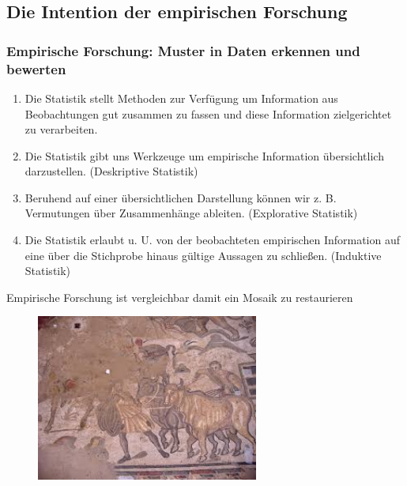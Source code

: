 \documentclass[usenames,dvipsnames,handout]{beamer}
\begin{document}
\subsection{Die Intention der empirischen Forschung}
\begin{frame}
 \frametitle{Empirische Forschung: Muster in Daten erkennen und bewerten}
 \begin{enumerate}
  \item {Die Statistik stellt Methoden zur Verfügung um Information aus Beobachtungen
  gut zusammen zu fassen und diese Information zielgerichtet zu verarbeiten.}
  \item {Die Statistik gibt uns Werkzeuge um empirische Information übersichtlich darzustellen.
  (Deskriptive Statistik)}
  \item {Beruhend auf einer übersichtlichen Darstellung können wir z. B. Vermutungen über Zusammenhänge
  ableiten. (Explorative Statistik)}
  \item {Die Statistik erlaubt u. U. von der beobachteten empirischen Information  auf eine über die Stichprobe hinaus gültige Aussagen zu schließen. (Induktive Statistik)}
 \end{enumerate}
\end{frame}

\begin{frame}{Empirische Forschung ist vergleichbar damit ein Mosaik zu restaurieren}
     \begin{figure}[ht]
 	\centering
 	      \includegraphics[width=0.65\textwidth]{incomplete.jpg}
 	\end{figure}
\end{frame}
\end{document}
